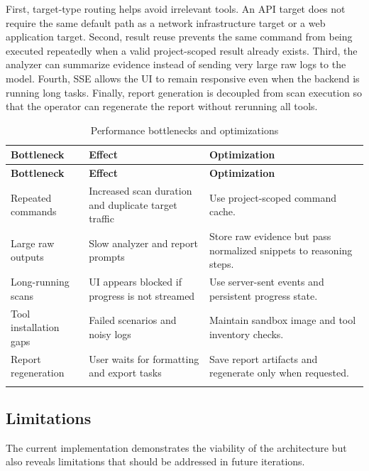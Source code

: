 \documentclass[12pt,a4paper]{report}
\begin{document}
First, target-type routing helps avoid irrelevant tools. An API target does not require
the same default path as a network infrastructure target or a web application target.
Second, result reuse prevents the same command from being executed repeatedly when a
valid project-scoped result already exists. Third, the analyzer can summarize evidence
instead of sending very large raw logs to the model. Fourth, SSE allows the UI to remain
responsive even when the backend is running long tasks. Finally, report generation is
decoupled from scan execution so that the operator can regenerate the report without
rerunning all tools.

\begin{longtable}{|p{}|p{}|p{}|}
\hline
\textbf{Bottleneck} & \textbf{Effect} & \textbf{Optimization} \\
\hline
\endfirsthead
\hline
\textbf{Bottleneck} & \textbf{Effect} & \textbf{Optimization} \\
\hline
\endhead
Repeated commands & Increased scan duration and duplicate target traffic & Use
project-scoped command cache. \\
\hline
Large raw outputs & Slow analyzer and report prompts & Store raw evidence but pass
normalized snippets to reasoning steps. \\
\hline
Long-running scans & UI appears blocked if progress is not streamed & Use server-sent
events and persistent progress state. \\
\hline
Tool installation gaps & Failed scenarios and noisy logs & Maintain sandbox image and
tool inventory checks. \\
\hline
Report regeneration & User waits for formatting and export tasks & Save report
artifacts and regenerate only when requested. \\
\hline
\caption{Performance bottlenecks and optimizations}
\label{tab:performance_bottlenecks}
\end{longtable}

\subsection{Limitations}

The current implementation demonstrates the viability of the architecture but also
reveals limitations that should be addressed in future iterations.
\end{document}
